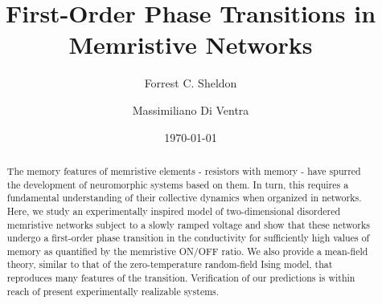 \documentclass[aps,prl,reprint,groupedaddress]{revtex4-1}
\begin{document}

\title{First-Order Phase Transitions in Memristive Networks}


\author{Forrest C. Sheldon}


\author{Massimiliano Di Ventra}


\date{\today}

\begin{abstract}
The memory features of memristive elements - resistors with memory - have spurred the development of neuromorphic systems based on them.
In turn, this requires a fundamental understanding of their collective
dynamics when organized in networks.  Here, we study an experimentally
inspired model of two-dimensional disordered memristive networks subject to a slowly
ramped voltage and show that these networks undergo a
first-order phase transition in the conductivity for sufficiently high
values of memory as quantified by the memristive ON/OFF ratio. We also
provide a mean-field theory, similar to that of the zero-temperature random-field Ising model, that reproduces many features of the transition. Verification of our predictions is within reach of 
present experimentally realizable systems. 
\end{abstract}
\end{document}
